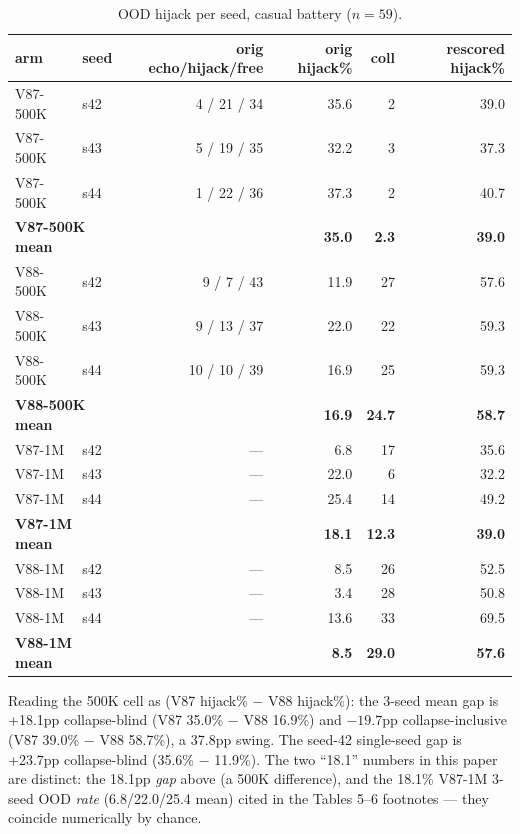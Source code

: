 \documentclass[11pt]{article}
\begin{document}
\begin{table}[!t]
\small
\caption{OOD hijack per seed, casual battery ($n=59$).}
\label{tab:appendix-b}
\centering
\begin{tabular}{llrrrr}
\toprule
arm & seed & orig echo/hijack/free & orig hijack\% & coll & rescored hijack\% \\
\midrule
V87-500K & s42 & 4 / 21 / 34 & 35.6 & 2 & 39.0 \\
V87-500K & s43 & 5 / 19 / 35 & 32.2 & 3 & 37.3 \\
V87-500K & s44 & 1 / 22 / 36 & 37.3 & 2 & 40.7 \\
\multicolumn{2}{l}{\textbf{V87-500K mean}} & & \textbf{35.0} & \textbf{2.3} & \textbf{39.0} \\
V88-500K & s42 & 9 / 7 / 43 & 11.9 & 27 & 57.6 \\
V88-500K & s43 & 9 / 13 / 37 & 22.0 & 22 & 59.3 \\
V88-500K & s44 & 10 / 10 / 39 & 16.9 & 25 & 59.3 \\
\multicolumn{2}{l}{\textbf{V88-500K mean}} & & \textbf{16.9} & \textbf{24.7} & \textbf{58.7} \\
V87-1M & s42 & --- & 6.8 & 17 & 35.6 \\
V87-1M & s43 & --- & 22.0 & 6 & 32.2 \\
V87-1M & s44 & --- & 25.4 & 14 & 49.2 \\
\multicolumn{2}{l}{\textbf{V87-1M mean}} & & \textbf{18.1} & \textbf{12.3} & \textbf{39.0} \\
V88-1M & s42 & --- & 8.5 & 26 & 52.5 \\
V88-1M & s43 & --- & 3.4 & 28 & 50.8 \\
V88-1M & s44 & --- & 13.6 & 33 & 69.5 \\
\multicolumn{2}{l}{\textbf{V88-1M mean}} & & \textbf{8.5} & \textbf{29.0} & \textbf{57.6} \\
\bottomrule
\end{tabular}
\end{table}

Reading the 500K cell as (V87 hijack\% $-$ V88 hijack\%): the 3-seed mean gap is +18.1pp collapse-blind (V87 35.0\% $-$ V88 16.9\%) and $-19.7$pp collapse-inclusive (V87 39.0\% $-$ V88 58.7\%), a 37.8pp swing. The seed-42 single-seed gap is +23.7pp collapse-blind (35.6\% $-$ 11.9\%). The two ``18.1'' numbers in this paper are distinct: the 18.1pp \emph{gap} above (a 500K difference), and the 18.1\% V87-1M 3-seed OOD \emph{rate} (6.8/22.0/25.4 mean) cited in the Tables 5--6 \textdagger{} footnotes --- they coincide numerically by chance.
\end{document}
